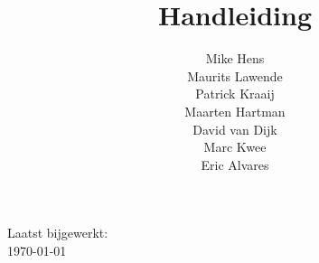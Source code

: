 \documentclass[11pt]{article}
\title{Handleiding \customerdomainuc}
\author{Mike Hens \\ Maurits Lawende \\ Patrick Kraaij \\ Maarten Hartman \\ David van Dijk \\ Marc Kwee \\ Eric Alvares}
\date{}
\begin{document}
\maketitle
\begin{center}

Laatst bijgewerkt: \\ \ddmmyyyydate \today
\end{center}
\pagebreak

\renewcommand*\contentsname{Inhoudsopgave}
\tableofcontents
\pagebreak









\clearpage
\end{document}
